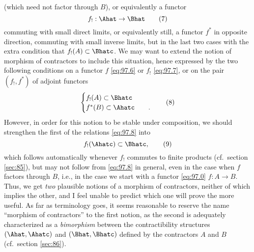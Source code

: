 (which need not factor through $B$), or equivalently a functor
\begin{equation}
  \label{eq:97.7}
  f_!:\Ahat\to\Bhat\tag{7}
\end{equation}
commuting with small direct limits, or equivalently still, a functor
$f^*$ in opposite direction, commuting with small inverse limits, but
in the last two cases with the extra condition that $f_!(A)\subset
\Bhatc$. We may want to extend the notion of morphism of contractors
to include this situation, hence expressed by the two following
conditions on a functor $f$ \eqref{eq:97.6} or $f_!$ \eqref{eq:97.7},
or on the pair $(f_!,f^*)$ of adjoint functors
\begin{equation}
  \label{eq:97.8}
  \begin{cases}
    f_!(A)\subset\Bhatc &\\
    f^*(B)\subset\Ahatc &\quad.
  \end{cases}\tag{8}
\end{equation}
However, in order for this notion to be stable under composition, we
should strengthen the first of the relations \eqref{eq:97.8} into
\begin{equation}
  \label{eq:97.9}
  f_!(\Ahatc)\subset\Bhatc,\tag{9}
\end{equation}
which follows automatically whenever $f_!$ commutes to finite products
(cf.\ section \ref{sec:85}), but may not follow from \eqref{eq:97.8}
in general, even in the case when $f$ factors through $B$, i.e., in
the case we start with a functor \eqref{eq:97.0} $f:A\to B$. Thus, we
get \emph{two} plausible notions of a morphism of contractors, neither
of which implies the other, and I feel unable to predict which one
will prove the more useful. As far as terminology goes, it seems
reasonable to reserve the name ``morphism of contractors'' to the
first notion, as the second is adequately characterized as a
\emph{bimorphism} between the contractibility structures
$(\Ahat,\Ahatc)$ and $(\Bhat,\Bhatc)$ defined by the contractors $A$
and $B$ (cf.\ section \ref{sec:86}).

\bigbreak
\noindent\hfill{}\par

